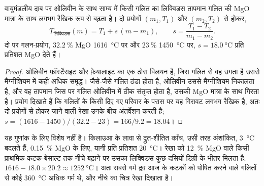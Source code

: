 \begin{proposition}[कोमैटिआइट तापमापी]\label{prop:b2:precambrian-earth:liquidus}
वायुमंडलीय दाब पर ओलिवीन के साथ साम्य में किसी गलित का लिक्विडस तापमान
गलित की MgO मात्रा के साथ लगभग रैखिक रूप से बढ़ता है। दो प्रयोगों $(m_1, T_1)$ और
$(m_2, T_2)$ से होकर,
\[
  T_{\text{लिक्विडस}}(m) = T_1 + s\,(m - m_1), \qquad s = \frac{T_1 - T_2}{m_1 - m_2} .
\]
दो  पर गलन-प्रयोग, $\qty{32.2}{\percent}$ MgO \qty{1616}{\celsius} पर और
$\qty{23}{\percent}$ \qty{1450}{\celsius} पर, $s = \qty{18.0}{\celsius}$ प्रति प्रतिशत
MgO देते हैं।
\end{proposition}

\begin{proof}
ओलिवीन फ़ॉर्स्टेराइट और फ़ेयालाइट का एक ठोस विलयन है, जिस गलित से वह उगता है उससे मैग्नीशियम में
कहीं अधिक समृद्ध। जैसे-जैसे गलित ठंडा होता है, ओलिवीन उससे मैग्नीशियम निकालता है, और वह तापमान
जिस पर गलित ओलिवीन में ठीक संतृप्त होता है, उसकी MgO मात्रा के साथ गिरता है। प्रयोग दिखाते हैं कि
गलितों के किसी दिए गए परिवार के परास पर यह गिरावट लगभग रैखिक है, अतः
दो प्रयोगों से होकर जाने वाली रेखा उनके बीच अंतर्वेशन करती है; $s = (1616 - 1450)/(32.2 - 23) = 166/9.2 = 18.04$।
\end{proof}

यह गुणांक  के लिए विशेष नहीं है। किलाउआ के लावा से द्रुत-शीतित काँच,
उसी तरह अंशांकित, \qty{3}{\celsius} बदलते हैं, \qty{0.15}{\percent} MgO के लिए, यानी
प्रति प्रतिशत \qty{20}{\celsius}।  रेखा को \qty{12}{\percent} MgO वाले
किसी प्राथमिक कटक-बेसाल्ट तक नीचे बढ़ाने पर उसका लिक्विडस कुछ दसियों डिग्री के भीतर मिलता है: $1616 -
18.0\times20.2 \approx \qty{1252}{\celsius}$। अतः सबसे गर्म  द्रव
आज के कटकों को पोषित करने वाले गलितों से कोई \qty{360}{\celsius} अधिक गर्म थे, और नीचे का चित्र
रेखा दिखाता है।

